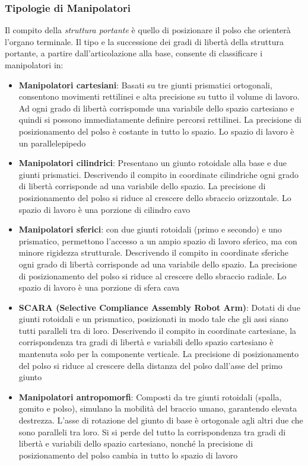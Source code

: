 ﻿\documentclass[11pt, a4paper]{article}
\begin{document}
\subsubsection{Tipologie di Manipolatori}
Il compito della \textit{struttura portante} è quello di posizionare il polso che orienterà l'organo terminale. Il tipo e la successione dei gradi di libertà della struttura portante, a partire dall'articolazione alla base, consente di classificare i manipolatori in:
\begin{itemize}
	\item \textbf{Manipolatori cartesiani}: Basati su tre giunti prismatici ortogonali, consentono movimenti rettilinei e alta precisione su tutto il volume di lavoro. Ad ogni grado di libertà corrispomde una variabile dello spazio cartesiano e quindi si possono immediatamente definire percorsi rettilinei. La precisione di posizionamento del polso è costante in tutto lo spazio. Lo spazio di lavoro è un parallelepipedo

	\item \textbf{Manipolatori cilindrici}: Presentano un giunto rotoidale alla base e due giunti prismatici. Descrivendo il compito in coordinate cilindriche ogni grado di libertà corrisponde ad una variabile dello spazio. La precisione di posizionamento del polso si riduce al crescere dello sbraccio orizzontale. Lo spazio di lavoro è una porzione di cilindro cavo

	\item \textbf{Manipolatori sferici}: con due giunti rotoidali (primo e secondo) e uno prismatico, permettono l'accesso a un ampio spazio di lavoro sferico, ma con minore rigidezza strutturale. Descrivendo il compito in coordinate sferiche ogni grado di libertà corrisponde ad una variabile dello spazio. La precisione di posizionamento del polso si riduce al crescere dello sbraccio radiale. Lo spazio di lavoro è una porzione di sfera cava


	\item \textbf{SCARA (Selective Compliance Assembly Robot Arm)}: Dotati di due giunti rotoidali e un prismatico, posizionati in modo tale che gli assi siano tutti paralleli tra di loro. Descrivendo il compito in coordinate cartesiane, la corrispondenza tra gradi di libertà e variabili dello spazio cartesiano è mantenuta solo per la componente verticale. La precisione di posizionamento del polso si riduce al crescere della distanza del polso dall'asse del primo giunto

	\item \textbf{Manipolatori antropomorfi}: Composti da tre giunti rotoidali (spalla, gomito e polso), simulano la mobilità del braccio umano, garantendo elevata destrezza. L'asse di rotazione del giunto di base è ortogonale agli altri due che sono paralleli tra loro. Si si perde del tutto la corrispondenza tra gradi di libertà e variabili dello spazio cartesiano, nonché la precisione di posizionamento del polso cambia in tutto lo spazio di lavoro


\end{itemize}
\end{document}
